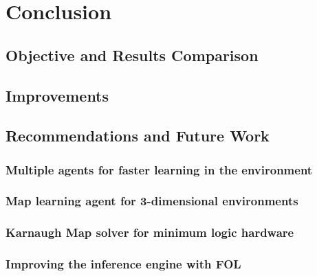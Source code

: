 






\chapter{Conclusion} 
\label{Conclusion}
\section{Objective and Results Comparison}
\section{Improvements}
\section{Recommendations and Future Work}
\subsection{Multiple agents for faster learning in the environment}
\subsection{Map learning agent for 3-dimensional environments}
\subsection{Karnaugh Map solver for minimum logic hardware}
\subsection{Improving the inference engine with FOL}